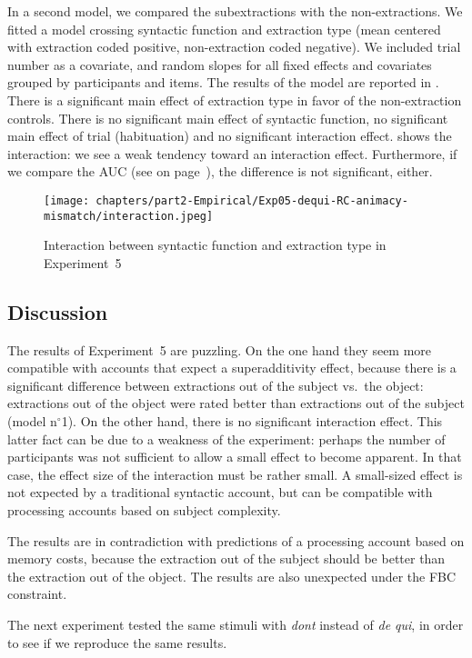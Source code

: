 

In a second model, we compared the subextractions with the non-extractions. We fitted a model crossing syntactic function and extraction type (mean centered with extraction coded positive, non-extraction coded negative). We included trial number as a covariate, and random slopes for all fixed effects and covariates grouped by participants and items. The results of the model are reported in . There is a significant main effect of extraction type in favor of the non-extraction controls. There is no significant main effect of syntactic function, no significant main effect of trial (habituation) and no significant interaction effect.  shows the interaction: we see a weak tendency toward an interaction effect. Furthermore, if we compare the AUC (see  on page~\pageref{fig:exp05-ROC-subj}), the difference is not significant, either.



\begin{figure}
    \centering
    \texttt{[image: chapters/part2-Empirical/Exp05-dequi-RC-animacy-mismatch/interaction.jpeg]}
    \caption{Interaction between syntactic function and extraction type in Experiment~5}
    \label{fig:exp05-interaction1}
\end{figure}

\subsection{Discussion}

The results of Experiment~5 are puzzling. On the one hand they seem more compatible with accounts that expect a superadditivity effect, because there is a significant difference between extractions out of the subject vs.\ the object: extractions out of the object were rated better than extractions out of the subject (model n$^{\circ}$1). On the other hand, there is no significant interaction effect. This latter fact can be due to a weakness of the experiment: perhaps the number of participants was not sufficient to allow a small effect to become apparent. In that case, the effect size of the interaction must be rather small. A small-sized effect is not expected by a traditional syntactic account, but can be compatible with processing accounts based on subject complexity. 

The results are in contradiction with predictions of a processing account based on memory costs, because the extraction out of the subject should be better than the extraction out of the object. The results are also unexpected under the FBC constraint. 

The next experiment tested the same stimuli with \emph{dont} instead of \emph{de qui}, in order to see if we reproduce the same results.
